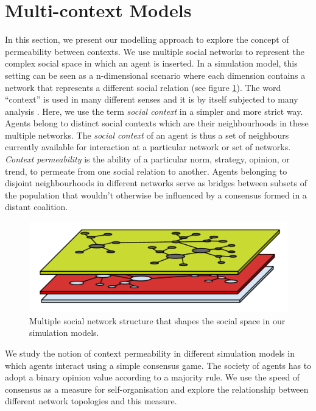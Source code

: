 \documentclass[preprint,number]{elsarticle}
\begin{document}
	\section{Multi-context Models}
	\label{sec:multi-context-models} 
        \noindent In this section, we present our modelling approach to explore the concept of
        permeability between contexts. We use multiple social networks to represent the complex
        social space in which an agent is inserted. In a simulation model, this setting can be seen
        as a n-dimensional scenario where each dimension contains a network that represents a
        different social relation (see figure \ref{img:multiple-relations}). The word ``context'' is
        used in many different senses and it is by itself subjected to many analysis
        \cite{Hayes1997}. Here, we use the term \textit{social context} in a simpler and more strict
        way. Agents belong to distinct social contexts which are their neighbourhoods in these
        multiple networks. The \textit{social context} of an agent is thus a set of neighbours
        currently available for interaction at a particular network or set of
        networks. \textit{Context permeability} is the ability of a particular norm, strategy,
        opinion, or trend, to permeate from one social relation to another. Agents belonging to
        disjoint neighbourhoods in different networks serve as bridges between subsets of the
        population that wouldn't otherwise be influenced by a consensus formed in a distant
        coalition.	
	
	\begin{figure}[h]
          \centering
          \includegraphics[width=0.7\linewidth]{./images/multi-context_model.pdf}
          \begin{minipage}{0.9\linewidth}
            \caption{Multiple social network structure that shapes the social space in our
              simulation models.}
            \label{img:multiple-relations}
          \end{minipage}
	\end{figure}
	
	We study the notion of context permeability in different simulation models in which agents
        interact using a simple consensus game. The society of agents has to adopt a binary opinion
        value according to a majority rule. We use the speed of consensus as a measure for
        self-organisation and explore the relationship between different network topologies and this
        measure.
	
\end{document}
